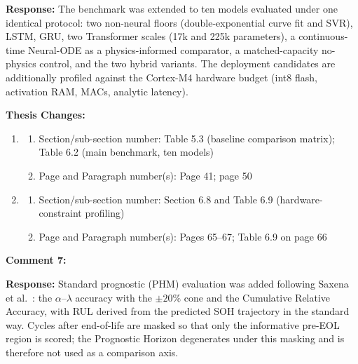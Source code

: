 \documentclass[12pt,a4paper]{article}
\begin{document}
\vspace{\baselineskip}

\textbf{Response:} The benchmark was extended to ten models evaluated under one
identical protocol: two non-neural floors (double-exponential curve fit and
SVR), LSTM, GRU, two Transformer scales (17k and 225k parameters), a
continuous-time Neural-ODE as a physics-informed comparator, a
matched-capacity no-physics control, and the two hybrid variants. The
deployment candidates are additionally profiled against the Cortex-M4 hardware
budget (int8 flash, activation RAM, MACs, analytic latency).

\vspace{\baselineskip}

\textbf{Thesis Changes:}

\begin{enumerate}
    \item
    \begin{enumerate}
        \item Section/sub-section number: Table 5.3 (baseline comparison matrix); Table 6.2 (main benchmark, ten models)
        \item Page and Paragraph number(s): Page 41; page 50
    \end{enumerate}
    \item
    \begin{enumerate}
        \item Section/sub-section number: Section 6.8 and Table 6.9 (hardware-constraint profiling)
        \item Page and Paragraph number(s): Pages 65--67; Table 6.9 on page 66
    \end{enumerate}
\end{enumerate}

\vspace{\baselineskip}

\textbf{Comment 7:} 

\vspace{\baselineskip}

\textbf{Response:} Standard prognostic (PHM) evaluation was added following
Saxena et al.~\cite{saxena2010}: the $\alpha$--$\lambda$ accuracy with the
$\pm 20\%$ cone and the Cumulative Relative Accuracy, with RUL derived from the
predicted SOH trajectory in the standard way. Cycles after end-of-life are
masked so that only the informative pre-EOL region is scored; the Prognostic
Horizon degenerates under this masking and is therefore not used as a
comparison axis.
\end{document}

